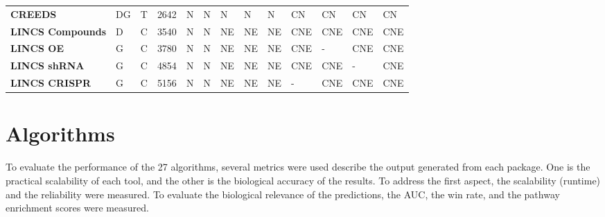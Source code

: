 \begin{table}[]
{\begin{tabular}{lllllllllllll}
\textbf{CREEDS}            & DG                    & T               & 2642                & N                 & N                 & N                               & N                            & N                            & CN                    & CN                & CN                   & CN                        \\
\textbf{LINCS Compounds}   & D                     & C               & 3540                & N                 & N                 & NE                              & NE                           & NE                           & CNE                   & CNE               & CNE                  & CNE                       \\
\textbf{LINCS OE}          & G                     & C               & 3780                & N                 & N                 & NE                              & NE                           & NE                           & CNE                   & -                 & CNE                  & CNE                       \\
\textbf{LINCS shRNA}       & G                     & C               & 4854                & N                 & N                 & NE                              & NE                           & NE                           & CNE                   & CNE               & -                    & CNE                       \\
\textbf{LINCS CRISPR}      & G                     & C               & 5156                & N                 & N                 & NE                              & NE                           & NE                           & -                     & CNE               & CNE                  & CNE                       \\ \hline
\end{tabular}%
}
\end{table}


\section{Algorithms} %
\label{sec:algorithms}

To evaluate the performance of the 27 algorithms, several metrics were used describe  the output generated from each package. One is the practical scalability of each tool, and the other is the biological accuracy of the results. To address the first aspect, the scalability (runtime) and the reliability were measured. To evaluate the biological relevance of the predictions, the AUC, the win rate, and the pathway enrichment scores were measured.

